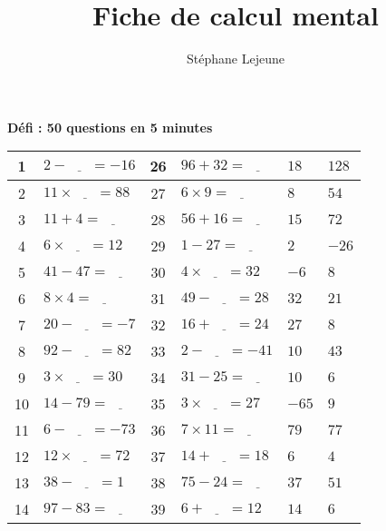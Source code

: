 \documentclass[french,a4paper,10pt]{article}
\title{\hspace{-2.0cm}\color{astral} \sffamily \bfseries Fiche de calcul mental}
\author{\hspace{-2.0cm}Stéphane Lejeune}
\date{}
\begin{document}
\maketitle
\begin{center}
\hspace*{-2cm}
\large \textbf{Défi : 50 questions en 5 minutes}
\end{center}
\noindent
\renewcommand{\arraystretch}{1.6}
\center
\begin{tabular}{|c|p{4cm}|c|p{4cm}||p{1cm}|p{1cm}|}
\hline
1 & $2 - \underline{\phantom{999}} = -16$ & 26 & $96 + 32 = \underline{\phantom{999}}$ & $18$ & $128$ \\
\hline
2 & $11 \times \underline{\phantom{999}} = 88$ & 27 & $6 \times 9 = \underline{\phantom{999}}$ & $8$ & $54$ \\
\hline
3 & $11 + 4 = \underline{\phantom{999}}$ & 28 & $56 + 16 = \underline{\phantom{999}}$ & $15$ & $72$ \\
\hline
4 & $6 \times \underline{\phantom{999}} = 12$ & 29 & $1 - 27 = \underline{\phantom{999}}$ & $2$ & $-26$ \\
\hline
5 & $41 - 47 = \underline{\phantom{999}}$ & 30 & $4 \times \underline{\phantom{999}} = 32$ & $-6$ & $8$ \\
\hline
6 & $8 \times 4 = \underline{\phantom{999}}$ & 31 & $49 - \underline{\phantom{999}} = 28$ & $32$ & $21$ \\
\hline
7 & $20 - \underline{\phantom{999}} = -7$ & 32 & $16 + \underline{\phantom{999}} = 24$ & $27$ & $8$ \\
\hline
8 & $92 - \underline{\phantom{999}} = 82$ & 33 & $2 - \underline{\phantom{999}} = -41$ & $10$ & $43$ \\
\hline
9 & $3 \times \underline{\phantom{999}} = 30$ & 34 & $31 - 25 = \underline{\phantom{999}}$ & $10$ & $6$ \\
\hline
10 & $14 - 79 = \underline{\phantom{999}}$ & 35 & $3 \times \underline{\phantom{999}} = 27$ & $-65$ & $9$ \\
\hline
11 & $6 - \underline{\phantom{999}} = -73$ & 36 & $7 \times 11 = \underline{\phantom{999}}$ & $79$ & $77$ \\
\hline
12 & $12 \times \underline{\phantom{999}} = 72$ & 37 & $14 + \underline{\phantom{999}} = 18$ & $6$ & $4$ \\
\hline
13 & $38 - \underline{\phantom{999}} = 1$ & 38 & $75 - 24 = \underline{\phantom{999}}$ & $37$ & $51$ \\
\hline
14 & $97 - 83 = \underline{\phantom{999}}$ & 39 & $6 + \underline{\phantom{999}} = 12$ & $14$ & $6$ \\

\end{tabular}
\end{document}
